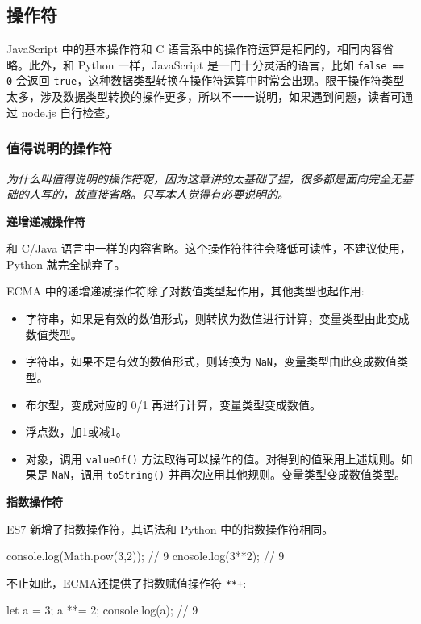 \subsection{操作符}

JavaScript 中的基本操作符和 C 语言系中的操作符运算是相同的，相同内容省略。此外，和 Python 一样，JavaScript 是一门十分灵活的语言，比如 \texttt{false == 0} 会返回 \texttt{true}，这种数据类型转换在操作符运算中时常会出现。限于操作符类型太多，涉及数据类型转换的操作更多，所以不一一说明，如果遇到问题，读者可通过 node.js 自行检查。

\subsubsection{值得说明的操作符}

\textit{为什么叫值得说明的操作符呢，因为这章讲的太基础了捏，很多都是面向完全无基础的人写的，故直接省略。只写本人觉得有必要说明的。}

\noindent\textbf{递增递减操作符}

和 C/Java 语言中一样的内容省略。这个操作符往往会降低可读性，不建议使用，Python 就完全抛弃了。

ECMA 中的递增递减操作符除了对数值类型起作用，其他类型也起作用:
\begin{itemize}
    \item 字符串，如果是有效的数值形式，则转换为数值进行计算，变量类型由此变成数值类型。
    \item 字符串，如果不是有效的数值形式，则转换为 \texttt{NaN}，变量类型由此变成数值类型。
    \item 布尔型，变成对应的 0/1 再进行计算，变量类型变成数值。
    \item 浮点数，加1或减1。
    \item 对象，调用 \texttt{valueOf()} 方法取得可以操作的值。对得到的值采用上述规则。如果是 \texttt{NaN}，调用 \texttt{toString()} 并再次应用其他规则。变量类型变成数值类型。
\end{itemize}

\noindent\textbf{指数操作符}

ES7 新增了指数操作符，其语法和 Python 中的指数操作符相同。

\begin{JavaScript}
console.log(Math.pow(3,2));     // 9
cnosole.log(3**2);              // 9
\end{JavaScript}

不止如此，ECMA还提供了指数赋值操作符 \texttt{**+}:

\begin{JavaScript}
let a = 3;
a **= 2;
console.log(a);     // 9
\end{JavaScript}

